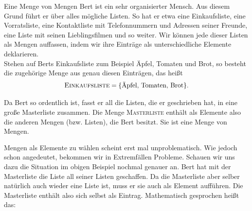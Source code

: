 \documentclass[../../main.tex]{subfiles}
\begin{document}
\begin{example}{Eine Menge von Mengen}
	Bert ist ein sehr organisierter Mensch. Aus diesem Grund führt er über alles mögliche Listen. So hat er etwa eine Einkaufsliste, eine Vorratsliste, eine Kontaktliste mit Telefonnummern und Adressen seiner Freunde, eine Liste mit seinen Lieblingsfilmen und so weiter. Wir können jede dieser Listen als Mengen auffassen, indem wir ihre Einträge als unterschiedliche Elemente deklarieren.\\
	
	Stehen auf Berts Einkaufsliste zum Beispiel	Äpfel, Tomaten und Brot, so besteht die zugehörige Menge aus genau diesen Einträgen, das heißt
	\[\textsc{Einkaufsliste} = \{\text{Äpfel, Tomaten, Brot}\}.\]
	
	Da Bert so ordentlich ist, fasst er all die Listen, die er geschrieben hat, in eine große Masterliste zusammen. Die Menge \textsc{Masterliste} enthält als Elemente also die anderen Mengen (bzw. Listen), die Bert besitzt. Sie ist eine Menge von Mengen.	
\end{example}

Mengen als Elemente zu wählen scheint erst mal unproblematisch. Wie jedoch schon angedeutet, bekommen wir in Extremfällen Probleme. Schauen wir uns dazu die Situation im obigen Beispiel nochmal genauer an. Bert hat mit der Masterliste die Liste all seiner Listen geschaffen. Da die Masterliste aber selber natürlich auch wieder eine Liste ist, muss er sie auch als Element aufführen. Die Masterliste enthält also sich selbst als Eintrag. Mathematisch gesprochen heißt das:
\end{document}
